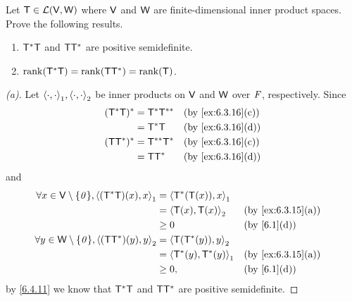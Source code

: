 \begin{ex}\label{ex:6.4.18}
  Let \(\mathsf{T} \in \mathcal{L}(\mathsf{V}, \mathsf{W})\) where \(\mathsf{V}\) and \(\mathsf{W}\) are finite-dimensional inner product spaces.
  Prove the following results.
  \begin{enumerate}
    \item \(\mathsf{T}^* \mathsf{T}\) and \(\mathsf{T} \mathsf{T}^*\) are positive semidefinite.
    \item \(\rk{\T^* \T} = \rk{\T \T^*} = \rk{\T}\).
  \end{enumerate}
\end{ex}

\begin{proof}[(a)]
  Let \(\inn{\cdot, \cdot}_1, \inn{\cdot, \cdot}_2\) be inner products on \(\mathsf{V}\) and \(\mathsf{W}\) over \(\mathit{F}\), respectively.
  Since
  \begin{align*}
    (\T^* \T)^* & = \T^* \T^{**} &  & \text{(by \cref{ex:6.3.16}(c))} \\
                & = \T^* \T      &  & \text{(by \cref{ex:6.3.16}(d))} \\
    (\T \T^*)^* & = \T^{**} \T^* &  & \text{(by \cref{ex:6.3.16}(c))} \\
                & = \T \T^*      &  & \text{(by \cref{ex:6.3.16}(d))}
  \end{align*}
  and
  \begin{align*}
    \forall x \in \V \setminus \set{\zv}, \inn{(\T^* \T)(x), x}_1 & = \inn{\T^*(\T(x)), x}_1                                        \\
                                                                  & = \inn{\T(x), \T(x)}_2     &  & \text{(by \cref{ex:6.3.15}(a))} \\
                                                                  & \geq 0                     &  & \text{(by \cref{6.1}(d))}       \\
    \forall y \in \W \setminus \set{\zv}, \inn{(\T \T^*)(y), y}_2 & = \inn{\T(\T^*(y)), y}_2                                        \\
                                                                  & = \inn{\T^*(y), \T^*(y)}_1 &  & \text{(by \cref{ex:6.3.15}(a))} \\
                                                                  & \geq 0,                    &  & \text{(by \cref{6.1}(d))}
  \end{align*}
  by \cref{6.4.11} we know that \(\mathsf{T}^* \mathsf{T}\) and \(\mathsf{T} \mathsf{T}^*\) are positive semidefinite.
\end{proof}

